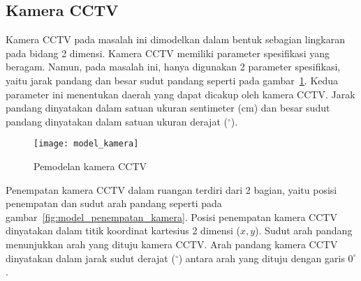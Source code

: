 \subsection{Kamera CCTV}
Kamera CCTV pada masalah ini dimodelkan dalam bentuk sebagian lingkaran pada bidang 2 dimensi. Kamera CCTV memiliki parameter spesifikasi yang beragam. Namun, pada masalah ini, hanya digunakan 2 parameter spesifikasi, yaitu jarak pandang dan besar sudut pandang seperti pada gambar~\ref{fig:model_kamera}. Kedua parameter ini menentukan daerah yang dapat dicakup oleh kamera CCTV. Jarak pandang dinyatakan dalam satuan ukuran sentimeter (cm) dan besar sudut pandang dinyatakan dalam satuan ukuran derajat (\(^\circ\)).



\begin{figure}[h]
	\centering  
	\texttt{[image: model\_kamera]}
	\caption[Pemodelan kamera CCTV]{Pemodelan kamera CCTV} 
	\label{fig:model_kamera}
\end{figure}

Penempatan kamera CCTV dalam ruangan terdiri dari 2 bagian, yaitu posisi penempatan dan sudut arah pandang seperti pada gambar~\ref{fig:model_penempatan_kamera}. Posisi penempatan kamera CCTV dinyatakan dalam titik koordinat kartesius 2 dimensi (\(x,y\)). Sudut arah pandang menunjukkan arah yang dituju kamera CCTV. Arah pandang kamera CCTV dinyatakan dalam jarak sudut derajat (\(^\circ\)) antara arah yang dituju dengan garis \(0^\circ\).

